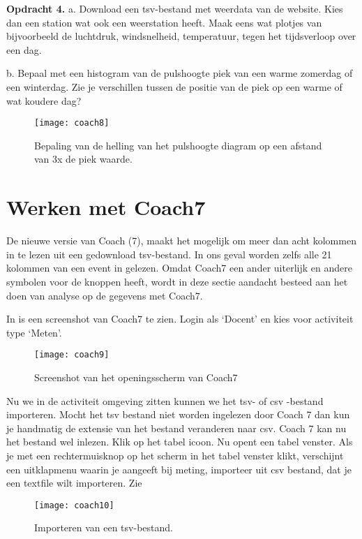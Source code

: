 \textbf{Opdracht 4.}
a.
Download een tsv-bestand met weerdata van de \hisparc website.
Kies dan een \hisparc station wat ook een weerstation heeft.
Maak eens wat plotjes van bijvoorbeeld de luchtdruk, windsnelheid, temperatuur,
tegen het tijdsverloop over een dag.

b. Bepaal met een histogram van de pulshoogte piek van een warme zomerdag of
een winterdag. Zie je verschillen tussen de positie van de piek op een warme of
wat koudere dag?

\begin{figure}
    \centering
    \texttt{[image: coach8]}
    \caption{Bepaling van de helling van het pulshoogte diagram op een afstand
    van 3x de piek waarde.}
    \label{fig:coach8}
\end{figure}

\section{Werken met Coach7}

De nieuwe versie van Coach (7), maakt het mogelijk om meer dan acht kolommen in te lezen
uit een gedownload tsv-bestand. In ons geval worden zelfs alle 21 kolommen van een event in gelezen.
Omdat Coach7 een ander uiterlijk en andere symbolen voor de knoppen heeft, wordt
in deze sectie aandacht besteed aan het doen van analyse op de gegevens met Coach7.

In  is een screenshot van Coach7 te zien.
Login als `Docent' en kies voor activiteit type `Meten'.


\begin{figure}
    \centering
    \texttt{[image: coach9]}
    \caption{Screenshot van het openingsscherm van Coach7}
    \label{fig:coach9}
\end{figure}

Nu we in de activiteit omgeving zitten kunnen we het tsv- of csv -bestand importeren.
Mocht het tsv bestand niet worden ingelezen door Coach 7 dan kun je handmatig de extensie
van het bestand veranderen naar csv. Coach 7 kan nu het bestand wel inlezen.
Klik op het tabel icoon. Nu opent een tabel venster.
Als je met een rechtermuisknop op het scherm in het tabel venster klikt, verschijnt
een uitklapmenu waarin je aangeeft bij meting, importeer uit csv bestand,
dat je een textfile wilt importeren.
Zie 

\begin{figure}
    \centering
    \texttt{[image: coach10]}
    \caption{Importeren van een tsv-bestand.}
    \label{fig:coach10}
\end{figure}

